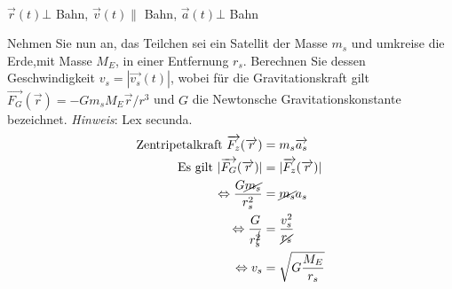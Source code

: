 \begin{enumeralph}
\begin{enumeroman}
\\
			$\overrightarrow{r}(t)\bot$ Bahn, $\overrightarrow{v}(t)\parallel$ Bahn, $\overrightarrow{a}(t)\bot$ Bahn
			\item Nehmen Sie nun an, das Teilchen sei ein Satellit der Masse $m_s$ und umkreise die Erde,mit Masse $M_E$, in einer Entfernung $r_s$.  Berechnen Sie dessen Geschwindigkeit $v_s=|\overrightarrow{v_s}(t)|$, wobei für die Gravitationskraft gilt $\overrightarrow{F_G}(\overrightarrow{r}) =-Gm_sM_E\overrightarrow{r}/r^3$ und $G$ die Newtonsche Gravitationskonstante bezeichnet. \textit{Hinweis}: Lex secunda.\\
			\begin{align*}
			\text{Zentripetalkraft } \overrightarrow{F_z}(\overrightarrow{r})&=m_s\overrightarrow{a_s}\\
			\text{Es gilt } |\overrightarrow{F_G}(\overrightarrow{r})| &= | \overrightarrow{F_z}(\overrightarrow{r})|\\
			\Leftrightarrow \frac{G\cancel{m_s}}{r_s^2}&=\cancel{m_s}a_s\\
			\Leftrightarrow \frac{G}{r_s^{\cancel{2}}}&=\frac{v_s^2}{\cancel{r_s}}\\
			\Leftrightarrow v_s &= \sqrt{G\frac{M_E}{r_s}}
			\end{align*}
		\end{enumeroman}
	\end{enumeralph}
